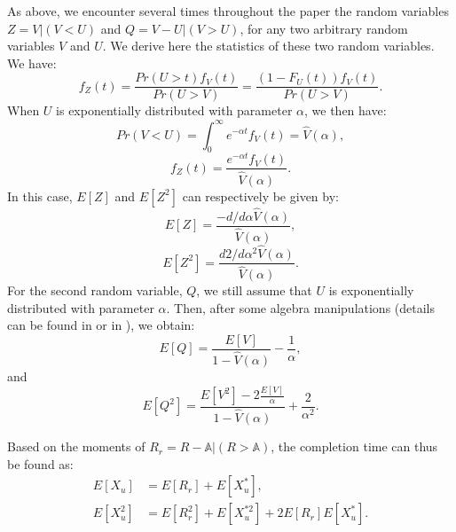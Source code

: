 \documentclass[11pt,journal,oneside,onecolumn,draftclsnofoot]{IEEEtran}
\begin{document}
As above, we encounter several times throughout the paper the random variables $Z=V|(V<U)$ and $Q=V-U|(V>U)$, for any two arbitrary random variables $V$ and $U$. We derive here the statistics of these two random variables. We have: 
\begin{equation}
f_{Z}(t)= \frac{Pr(U>t)f_{V}(t)}{Pr(U>V)} = \frac{(1-F_U(t))f_{V}(t)}{Pr(U>V)}. 
\label{eq:fY-X}
\end{equation}
When $U$ is exponentially distributed with parameter $\alpha$, we then have: 
\begin{equation}
Pr(V<U)=\int_{0}^{\infty}{e^{-\alpha t}f_V(t)}=\widehat{V}(\alpha),
\label{eq:PrX-Y-Exp}
\end{equation}
\begin{equation}
f_{Z}(t)= \frac{e^{-\alpha t} f_{V}(t)}{\widehat{V}(\alpha)}.  
\label{eq:fY-X-Exp}
\end{equation}
In this case, $E[Z]$ and $E[Z^2]$ can respectively be given by:
\begin{equation}
E[Z]= \frac{-d/d\alpha \widehat{V}(\alpha)}{\widehat{V}(\alpha)},  
\label{eq:EX-Y-Exp}
\end{equation}
\begin{equation}
E[Z^2]= \frac{d2/d\alpha^2 \widehat{V}(\alpha)}{\widehat{V}(\alpha)}.  
\label{eq:E2X-Y-Exp}
\end{equation}
For the second random variable, $Q$, we still assume that $U$ is exponentially distributed with parameter $\alpha$. Then, after some algebra manipulations (details can be found in \cite[Lemma2]{federgruen86} or in \cite{takagi91}), we obtain: 
\begin{equation}
E[Q]= \frac{E[V]}{1-\widehat{V}(\alpha)} - \frac{1}{\alpha},  
\label{eq:EQ}
\end{equation}
and 
\begin{equation}
E[Q^2]= \frac{E[V^2]-2\frac{E[V]}{\alpha}}{1-\widehat{V}(\alpha)} +  \frac{2}{\alpha^2}.  
\label{eq:E2Q}
\end{equation} 

Based on the moments of $R_{r}=R-\mathbb{A}|(R>\mathbb{A})$, the completion time can thus be found as:
\begin{align}
E[X_u]&=E[R_{r}]+E[X_u^*], \nonumber \\
E[X^2_u]&=E[R^2_{r}]+E[X^{*2}_u]+2E[R_{r}]E[X_u^*].
\label{eq:X_u}
\end{align}



 
\end{document}
